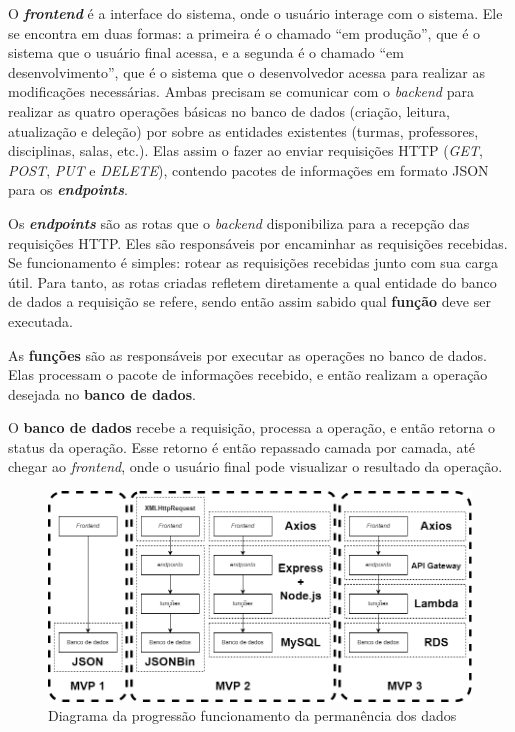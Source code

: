 
O \textbf{\textit{frontend}} é a interface do sistema, onde o usuário interage com o sistema. Ele se encontra em duas formas: a primeira é o chamado ``em produção'', que é o sistema que o usuário final acessa, e a segunda é o chamado ``em desenvolvimento'', que é o sistema que o desenvolvedor acessa para realizar as modificações necessárias. Ambas precisam se comunicar com o \textit{backend} para realizar as quatro operações básicas no banco de dados (criação, leitura, atualização e deleção) por sobre as entidades existentes (turmas, professores, disciplinas, salas, etc.). Elas assim o fazer ao enviar requisições HTTP (\textit{GET}, \textit{POST}, \textit{PUT} e \textit{DELETE}), contendo pacotes de informações em formato JSON para os \textbf{\textit{endpoints}}.

Os \textbf{\textit{endpoints}} são as rotas que o \textit{backend} disponibiliza para a recepção das requisições HTTP. Eles são responsáveis por encaminhar as requisições recebidas. Se funcionamento é simples: rotear as requisições recebidas junto com sua carga útil. Para tanto, as rotas criadas refletem diretamente a qual entidade do banco de dados a requisição se refere, sendo então assim sabido qual \textbf{função} deve ser executada.

As \textbf{funções} são as responsáveis por executar as operações no banco de dados. Elas processam o pacote de informações recebido, e então realizam a operação desejada no \textbf{banco de dados}.

O \textbf{banco de dados} recebe a requisição, processa a operação, e então retorna o status da operação. Esse retorno é então repassado camada por camada, até chegar ao \textit{frontend}, onde o usuário final pode visualizar o resultado da operação.


\begin{figure}[htbp]
  \centering
  \caption{Diagrama da progressão funcionamento da permanência dos dados\label{fig:API}}
  \includegraphics[scale=0.5]{files/img/Codificacao/API - com diagrama.png}
  \legend{\selfAuthor}
\end{figure}


